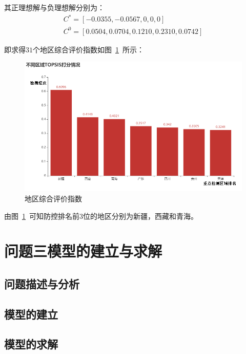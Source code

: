 \documentclass{whutmod}
\begin{document}
    其正理想解与负理想解分别为：
    \begin{gather}
    C^{*}=[-0.0355,-0.0567,0,0,0]\\
    C^{0}=[0.0504,0.0704,0.1210,0.2310,0.0742]
    \end{gather}
    
    即求得$31$个地区综合评价指数如图~\ref{area}~所示：
    \begin{figure}[H]
    	\centering
    	\includegraphics[width=.9\textwidth]{figures/area.png}
    	\caption{地区综合评价指数}\label{area}
    \end{figure}
    由图~\ref{area}~可知防控排名前$3$位的地区分别为新疆，西藏和青海。
    
    


     	\section{问题三模型的建立与求解}
     \subsection{问题描述与分析}
    
     
     
     \subsection{模型的建立}
     
     
     
     
     \subsection{模型的求解}   
     
\end{document}
